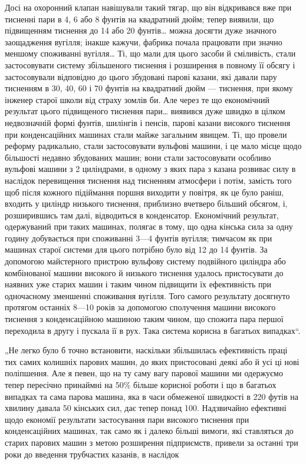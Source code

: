 \parcont{}  %
Досі на охоронний клапан навішували такий тягар, що він відкривався вже при тисненні пари в 4, 6 або
8 фунтів на квадратний
дюйм; тепер виявили, що підвищенням тиснення до 14 або 20 фунтів\dots{} можна досягти дуже значного
заощадження вугілля; інакше
кажучи, фабрика почала працювати при значно меншому споживанні вугілля\dots{} Ті, що мали для цього
засоби й сміливість, стали
застосовувати систему збільшеного тиснення і розширення в повному її обсягу і застосовували
відповідно до цього збудовані парові казани, які давали пару тисненням в 30, 40, 60 і 70 фунтів на
квадратний дюйм — тиснення, при якому інженер старої школи
від страху зомлів би. Але через те що економічний результат
цього підвищеного тиснення пари\dots{} виявився дуже швидко в цілком недвозначній формі фунтів, шилінгів
і пенсів, парові казани
високого тиснення при конденсаційних машинах стали майже загальним явищем. Ті, що провели реформу
радикально, стали застосовувати вульфові машини, і це мало місце щодо більшості недавно
збудованих машин; вони стали застосовувати особливо вульфові
машини з 2 циліндрами, в одному з яких пара з казана розвиває силу в наслідок перевищення тиснення
над тисненням атмосфери і потім, замість того щоб після кожного підіймання поршня
виходити у повітря, як це було раніш, входить у циліндр
низького тиснення, приблизно вчетверо більший обсягом, і, розширившись там далі, відводиться в
конденсатор. Економічний
результат, одержуваний при таких машинах, полягає в тому, що
одна кінська сила за одну годину добувається при споживанні
3—4 фунтів вугілля; тимчасом як при машинах старої системи
для цього потрібно було від 12 до 14 фунтів. За допомогою
майстерного пристрою вульфову систему подвійного циліндра
або комбінованої машини високого й низького тиснення удалось
пристосувати до наявних уже старих машин і таким чином підвищити їх ефективність при одночасному
зменшенні споживання
вугілля. Того самого результату досягнуто протягом останніх
8—10 років за допомогою сполучення машини високого тиснення
з конденсаційною машиною таким чином, що спожита пара першої переходила в другу і пускала її в рух.
Така система корисна
в багатьох випадках“.

„Не легко було б точно встановити, наскільки збільшилась
ефективність праці тих самих колишніх парових машин, до
яких пристосовані деякі або й усі ці нові поліпшення. Але я певен, що на ту саму вагу парової машини
ми одержуємо тепер
пересічно принаймні на 50\% більше корисної роботи і що в багатьох випадках та сама парова машина,
яка в часи обмеженої
швидкості в 220 футів на хвилину давала 50 кінських сил, дає
тепер понад 100. Надзвичайно ефективні щодо економії результати
застосування пари високого тиснення при конденсаційних машинах, так само як і далеко більші вимоги,
які ставляться до старих парових машин з метою розширення підприємств, привели
за останні три роки до введення трубчастих казанів, в наслідок
\parbreak{}  %
